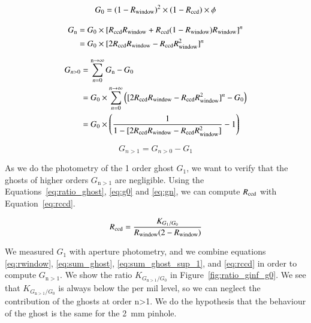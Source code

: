  \begin{equation}
     G_0 = (1-R_{\mathrm{window}})^{2} \times (1-R_{\mathrm{ccd}}) \times \phi
     \label{eq:g0}
 \end{equation}

\begin{equation}
\begin{aligned}
    G_\mathrm{n} & = G_{0} \times [R_{\mathrm{ccd}} R_{\mathrm{window}} + R_{\mathrm{ccd}}(1-R_{\mathrm{window}})R_{\mathrm{window}}]^{n} \\
    & = G_{0} \times [2 R_{\mathrm{ccd}} R_{\mathrm{window}} - R_{\mathrm{ccd}} R_{\mathrm{window}}^{2}] ^{n} \\
     \label{eq:gn}
\end{aligned}
\end{equation}

 \begin{equation}
 \begin{aligned}
     G_{n>0} & = \sum_{n=0}^{\mathrm{n} \rightarrow \infty} G_\mathrm{n} - G_0 \\
     & = G_0 \times \sum_{n=0}^{n \rightarrow \infty} \left( [2 R_{\mathrm{ccd}} R_{\mathrm{window}} - R_{\mathrm{ccd}} R_{\mathrm{window}}^{2}] ^{n} - G_0 \right)\\
     & = G_0 \times\left( \frac{1}{1- [2 R_{\mathrm{ccd}} R_{\mathrm{window}} - R_{\mathrm{ccd}} R_{\mathrm{window}}^{2}]} - 1\right)
     \label{eq:sum_ghost}
 \end{aligned}
 \end{equation}

 \begin{equation}
     G_{n>1} = G_{n>0} - G_1
     \label{eq:sum_ghost_sup_1}
 \end{equation}

As we do the photometry of the 1 order ghost $G_1$, we want to verify that the ghosts of higher orders $G_{\mathrm{n}>1}$ are negligible. Using the Equations~\ref{eq:ratio_ghost}, \ref{eq:g0} and \ref{eq:gn}, we can compute $R_{\mathrm{ccd}}$ with Equation~\ref{eq:rccd}.

\begin{equation}
    R_{\mathrm{ccd}} = \frac{K_{G_1/G_0}}{R_{\mathrm{window}} (2 - R_{\mathrm{window}})}
    \label{eq:rccd}
\end{equation}

We measured $G_1$ with aperture photometry, and we combine equations \ref{eq:rwindow}, \ref{eq:sum_ghost}, \ref{eq:sum_ghost_sup_1}, and \ref{eq:rccd} in order to compute $G_{\mathrm{n}>1}$. We show the ratio $K_{G_{\mathrm{n}>1}/G_0}$ in Figure~\ref{fig:ratio_ginf_g0}. We see that $K_{G_{\mathrm{n}>1}/G_0}$ is always below the per mil level, so we can neglect the contribution of the ghosts at order n>1. We do the hypothesis that the behaviour of the ghost is the same for the \SI{2}{\milli\meter} pinhole.


